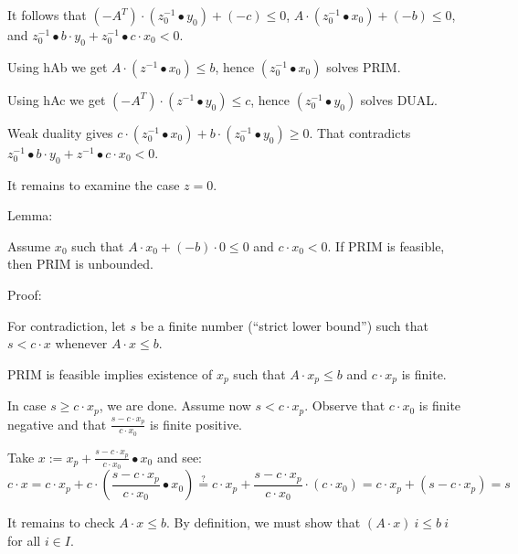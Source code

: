 \documentclass[]{article}
\begin{document}

It follows that
$(-A^T) \cdot (z_0^{-1} \bullet y_0) + (-c) \le 0$,
$A \cdot (z_0^{-1} \bullet x_0) + (-b) \le 0$, and
$z_0^{-1} \bullet b \cdot y_0 + z_0^{-1} \bullet c \cdot x_0 < 0$.

Using hAb we get $A \cdot (z^{-1} \bullet x_0) \le b$,
hence $(z_0^{-1} \bullet x_0)$ solves PRIM.

Using hAc we get $(-A^T) \cdot (z^{-1} \bullet y_0) \le c$,
hence $(z_0^{-1} \bullet y_0)$ solves DUAL.

Weak duality gives
$c \cdot (z_0^{-1} \bullet x_0) + b \cdot (z_0^{-1} \bullet y_0) \ge 0$.
That contradicts
$z_0^{-1} \bullet b \cdot y_0 + z^{-1} \bullet c \cdot x_0 < 0$.

It remains to examine the case $z = 0$.

Lemma:

Assume $x_0$ such that
$A \cdot x_0 + (-b) \cdot 0 \le 0$ and
$c \cdot x_0 < 0$.
If PRIM is feasible, then PRIM is unbounded.

Proof:

For contradiction, let $s$ be a finite number (``strict lower bound'')
such that $s < c \cdot x$ whenever $A \cdot x \le b$.

PRIM is feasible implies existence of $x_p$ such that
$A \cdot x_p \le b$ and $c \cdot x_p$ is finite.

In case $s \ge c \cdot x_p$, we are done. Assume now $s < c \cdot x_p$.
Observe that $c \cdot x_0$ is finite negative 
and that $\frac{s - c \cdot x_p}{c \cdot x_0}$ is finite positive.

Take $x := x_p + \frac{s - c \cdot x_p}{c \cdot x_0} \bullet x_0$ and see:
$$ c \cdot x
 = c \cdot x_p + c \cdot \left( \frac{s - c \cdot x_p}{c \cdot x_0} \bullet x_0 \right)
 \stackrel{?}{=} c \cdot x_p + \frac{s - c \cdot x_p}{c \cdot x_0} \cdot (c \cdot x_0)
 = c \cdot x_p + (s - c \cdot x_p)
 = s $$

It remains to check $A \cdot x \le b$.
By definition, we must show that $(A \cdot x)~i \le b~i$ for all $i \in I$.
\end{document}
